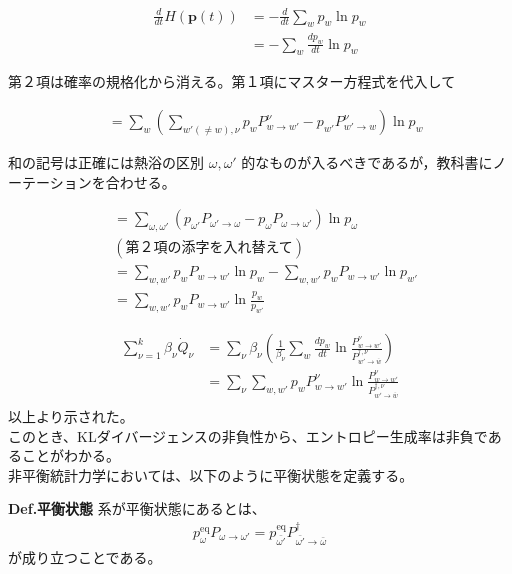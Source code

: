 \documentclass[a4paper,11pt]{jsarticle}
\numberwithin{equation}{section}
\begin{document}
\begin{align}
\frac{d}{dt} H(\mathbf{p}(t)) &= - \frac{d}{dt} \sum_w p_w \ln p_w \\
&= - \sum_w \frac{dp_w}{dt} \ln p_w
\end{align}

第２項は確率の規格化から消える。第１項にマスター方程式を代入して

\begin{align}
&= \sum_w \left( \sum_{w'(\neq w), \nu} p_w P_{w \to w'}^\nu - p_{w'} P_{w' \to w}^\nu \right) \ln p_w
\end{align}

和の記号は正確には熱浴の区別 $\omega, \omega'$ 的なものが入るべきであるが，教科書にノーテーションを合わせる。

\begin{align}
&= \sum_{\omega, \omega'} \left( p_{\omega'} P_{\omega' \rightarrow \omega} - p_\omega P_{\omega \rightarrow \omega'} \right) \ln p_\omega \\
&(\text{第２項の添字を入れ替えて})\\
&= \sum_{w, w'} p_w P_{w \to w'} \ln p_w - \sum_{w, w'} p_w P_{w \to w'} \ln p_{w'} \\
&= \sum_{w, w'} p_w P_{w \to w'} \ln \frac{p_w}{p_{w'}}
\end{align}

\begin{align}
\sum_{\nu=1}^{k} \beta_\nu \dot{Q}_\nu &= \sum_{\nu} \beta_\nu \left( \frac{1}{\beta_\nu} \sum_w \frac{dp_w}{dt} \ln \frac{P_{w \to w'}^\nu}{P_{w' \to \overline{w}}^{\dagger, \nu}} \right)\\
&= \sum_{\nu} \sum_{w, w'} p_w P_{w \to w'}^\nu \ln \frac{P_{w \to w'}^\nu}{P_{w' \to \overline{w}}^{\dagger, \nu}}\\
\end{align}
以上より示された。\\
このとき、KLダイバージェンスの非負性から、エントロピー生成率は非負であることがわかる。\\

非平衡統計力学においては、以下のように平衡状態を定義する。
\begin{itembox}[l]{\textbf{Def.平衡状態}}
  系が平衡状態にあるとは、
  \begin{align}
    p_{\omega}^{\text{eq}}P_{\omega \to \omega'} = p_{\bar{\omega'}}^{\text{eq}}P_{\bar{\omega'} \to \bar{\omega}}^{\dagger}
  \end{align}
  が成り立つことである。

\end{itembox}
\end{document}
